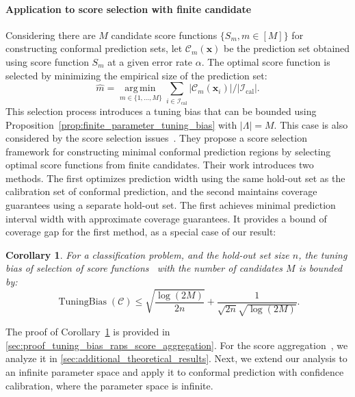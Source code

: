 \documentclass{article}
\newcommand{\1}{\mathbbm{1}}
\newcommand{\argmin}[1]{\underset{#1}{\operatorname{arg\,min\,}}}
\newcommand{\TuningBias}{\mathop{\text{TuningBias}}}
\theoremstyle{plain}
\newtheorem{corollary}[theorem]{Corollary}
\theoremstyle{definition}
\theoremstyle{remark}
\begin{document}
\paragraph{Application to score selection with finite candidate}
Considering there are $M$ candidate score functions $\{S_m, m \in [M]\}$ for constructing conformal prediction sets, let $\mathcal{C}_m(\boldsymbol{x})$ be the prediction set obtained using score function $S_m$ at a given error rate $\alpha$. 
The optimal score function is selected by minimizing the empirical size of the prediction set:
\begin{equation*}
    \hat{m} = \argmin{m \in \{1,\ldots,M\}} \sum_{i \in \mathcal{I}_{\text{cal}}}|\mathcal{C}_m(\boldsymbol{x}_i)|/|\mathcal{I}_{\text{cal}}|.
\end{equation*}
This selection process introduces a tuning bias that can be bounded using Proposition~\ref{prop:finite_parameter_tuning_bias} with $|\Lambda| = M$. 
This case is also considered by the score selection issues~\citep{yang2024selection}.  
They propose a score selection framework for constructing minimal conformal prediction regions by selecting optimal score functions from finite candidates. 
Their work introduces two methods. 
The first optimizes prediction width using the same hold-out set as the calibration set of conformal prediction, and the second maintains coverage guarantees using a separate hold-out set. 
The first achieves minimal prediction interval width with approximate coverage guarantees. 
It provides a bound of coverage gap for the first method, as a special case of our result:
\begin{corollary}
    \label{corollary:tuning_bias_score_aggregation}
    For a classification problem, and the hold-out set size \(n\), the tuning bias of selection of score functions~\citep{yang2024selection} with the number of candidates \(M\) is bounded by:
    \begin{equation*}
        \TuningBias({\mathcal{C}}) \leq \sqrt{\frac{\log(2M)}{2n}} + \frac{1}{\sqrt{2n}\sqrt{\log(2M)}}.
    \end{equation*}
\end{corollary}
The proof of Corollary~\ref{corollary:tuning_bias_score_aggregation} is provided in \cref{sec:proof_tuning_bias_raps_score_aggregation}.
For the score aggregation~\citep{luo2024weighted}, we analyze it in \cref{sec:additional_theoretical_results}. 
Next, we extend our analysis to an infinite parameter space and apply it to conformal prediction with confidence calibration, where the parameter space is infinite.
\end{document}

